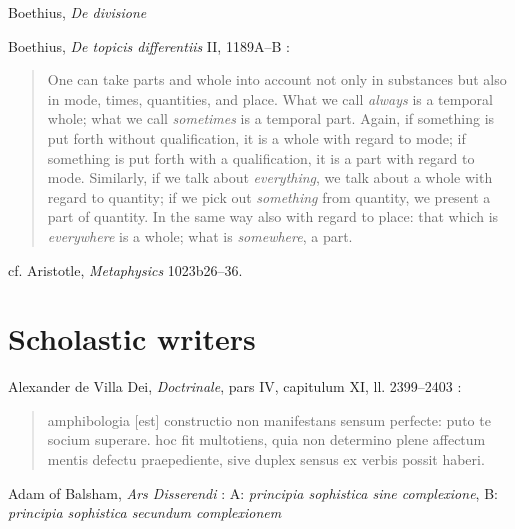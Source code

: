 \documentclass{article}
\begin{document}
Boethius, {\em De divisione}

Boethius, {\em De topicis differentiis} II, 1189A--B \cite[p.~52]{topicis}:

\begin{quote}
One can take parts and whole into account not only in substances
but also in mode, times, quantities, and place.
What we call {\em always} is a temporal whole; what we call {\em sometimes}
is a temporal part. Again, if something is put forth without
qualification, it is a whole with regard to mode; if something
is put forth with a qualification, it is a part with
regard to mode. Similarly, if we talk about {\em everything}, we talk about a
whole with regard to quantity; if we pick out {\em something} from
quantity, we present a part of quantity. In the same way also
with regard to place: that which is {\em everywhere} is a whole; what
is {\em somewhere}, a part.
\end{quote}

cf. Aristotle, {\em Metaphysics} 1023b26--36.



















\section{Scholastic writers}
Alexander de Villa Dei, {\em Doctrinale}, pars IV, capitulum XI, ll. 2399--2403 \cite[p.~159]{doctrinale}:

\begin{quote}
amphibologia [est] constructio non manifestans sensum perfecte:
puto te socium superare. hoc fit multotiens, quia non determino plene
affectum mentis defectu praepediente, sive duplex sensus ex verbis possit
haberi.
\end{quote}









Adam of Balsham, {\em Ars Disserendi} \cite[pp.~64--65]{modernorum1}: 
A: {\em principia sophistica sine complexione}, B: {\em principia sophistica secundum complexionem}
\end{document}
